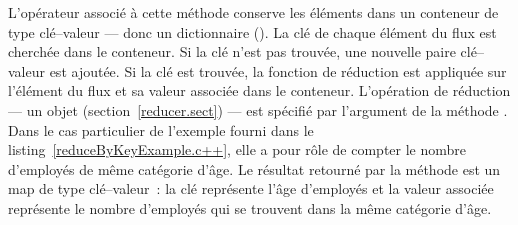 L'opérateur  associ\'e \`a cette m\'ethode conserve les \'el\'ements dans un conteneur de type cl\'e--valeur --- donc un dictionnaire (). La cl\'e de chaque \'el\'ement du flux est cherch\'ee dans le conteneur. Si la cl\'e n'est pas trouv\'ee, une nouvelle paire cl\'e--valeur est ajout\'ee. Si la cl\'e est trouv\'ee, la fonction de r\'eduction est appliqu\'ee sur l'\'el\'ement du flux et sa valeur associ\'ee dans le conteneur. L'op\'eration de r\'eduction --- un objet  (section~\ref{reducer.sect})  --- est sp\'ecifi\'e par l'argument de la m\'ethode . Dans le cas particulier de l'exemple fourni dans le listing~\ref{reduceByKeyExample.c++}, elle a pour r\^ole de compter le nombre d'employ\'es de m\^eme catégorie d'\^age. Le r\'esultat retourn\'e par la m\'ethode  est un map de type cl\'e--valeur~: la cl\'e repr\'esente l'\^age d'employ\'es et la valeur associ\'ee repr\'esente le nombre d'employ\'es qui se trouvent dans la m\^eme cat\'egorie d'\^age.
